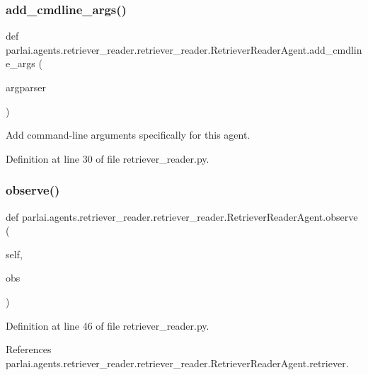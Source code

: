 \subsubsection{\texorpdfstring{add\+\_\+cmdline\+\_\+args()}{add\_cmdline\_args()}}
{\footnotesize\ttfamily def parlai.\+agents.\+retriever\+\_\+reader.\+retriever\+\_\+reader.\+Retriever\+Reader\+Agent.\+add\+\_\+cmdline\+\_\+args (\begin{DoxyParamCaption}\item[{}]{argparser }\end{DoxyParamCaption})\hspace{0.3cm}{\ttfamily [static]}}

\begin{DoxyVerb}Add command-line arguments specifically for this agent.\end{DoxyVerb}
 

Definition at line 30 of file retriever\+\_\+reader.\+py.

\mbox{\label{classparlai_1_1agents_1_1retriever__reader_1_1retriever__reader_1_1RetrieverReaderAgent_a093b0a679a2cc8a09ed3a4ae314362b1}} 
\subsubsection{\texorpdfstring{observe()}{observe()}}
{\footnotesize\ttfamily def parlai.\+agents.\+retriever\+\_\+reader.\+retriever\+\_\+reader.\+Retriever\+Reader\+Agent.\+observe (\begin{DoxyParamCaption}\item[{}]{self,  }\item[{}]{obs }\end{DoxyParamCaption})}



Definition at line 46 of file retriever\+\_\+reader.\+py.



References parlai.\+agents.\+retriever\+\_\+reader.\+retriever\+\_\+reader.\+Retriever\+Reader\+Agent.\+retriever.



